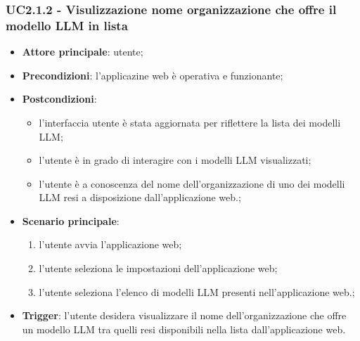 \documentclass[10pt, a4paper]{article}
\begin{document}
    \subsubsection{UC2.1.2 - Visulizzazione nome organizzazione che offre il modello LLM in lista}
    \begin{itemize}
        \item \textbf{Attore principale}: utente;
        \item \textbf{Precondizioni}: l'applicazine web è operativa e funzionante;
        \item \textbf{Postcondizioni}: 
        \begin{itemize}
            \item l'interfaccia utente è stata aggiornata per riflettere la lista dei modelli LLM;
            \item l'utente è in grado di interagire con i modelli LLM visualizzati;
            \item l'utente è a conoscenza del nome dell'organizzazione di uno dei modelli LLM resi a disposizione dall'applicazione web.;
        \end{itemize}
        \item \textbf{Scenario principale}:
            \begin{enumerate}
                \item l'utente avvia l'applicazione web;
                \item l'utente seleziona le impostazioni dell'applicazione web;
                \item l'utente seleziona l'elenco di modelli LLM presenti nell'applicazione web.;
            \end{enumerate}
        \item \textbf{Trigger}: l'utente desidera visualizzare il nome dell'organizzazione che offre un modello LLM tra quelli resi disponibili nella lista dall'applicazione web.
    \end{itemize}
\end{document}
